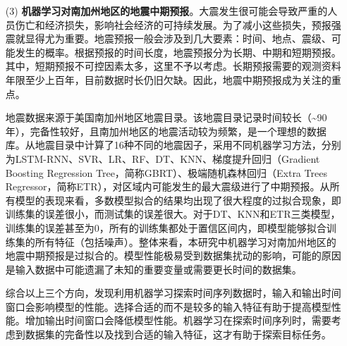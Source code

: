 \begin{enumerate}
  \item[(3)] \textbf{机器学习对南加州地区的地震中期预报}。大震发生很可能会导致严重的人员伤亡和经济损失，影响社会经济的可持续发展。为了减小这些损失，预报强震就显得尤为重要。地震预报一般会涉及到几大要素：时间、地点、震级、可能发生的概率。根据预报的时间长度，地震预报分为长期、中期和短期预报。其中，短期预报不可控因素太多，这里不予以考虑。长期预报需要的观测资料年限至少上百年，目前数据时长仍旧欠缺。因此，地震中期预报成为关注的重点。
  
  地震数据来源于美国南加州地区地震目录。该地震目录记录时间较长（\sim 90年），完备性较好，且南加州地区的地震活动较为频繁，是一个理想的数据库。从地震目录中计算了16种不同的地震因子，采用不同机器学习方法，分别为LSTM-RNN、SVR、LR、RF、DT、KNN、梯度提升回归（Gradient Boosting Regression Tree，简称GBRT）、极端随机森林回归（Extra Trees Regressor，简称ETR），对区域内可能发生的最大震级进行了中期预报。从所有模型的表现来看，多数模型拟合的结果均出现了很大程度的过拟合现象，即训练集的误差很小，而测试集的误差很大。对于DT、KNN和ETR三类模型，训练集的误差甚至为0，所有的训练集都处于置信区间内，即模型能够拟合训练集的所有特征（包括噪声）。整体来看，本研究中机器学习对南加州地区的地震中期预报是过拟合的。模型性能极易受到数据集扰动的影响，可能的原因是输入数据中可能遗漏了未知的重要变量或需要更长时间的数据集。

  综合以上三个方向，发现利用机器学习探索时间序列数据时，输入和输出时间窗口会影响模型的性能。选择合适的而不是较多的输入特征有助于提高模型性能。增加输出时间窗口会降低模型性能。机器学习在探索时间序列时，需要考虑到数据集的完备性以及找到合适的输入特征，这才有助于探索目标任务。

\end{enumerate}


